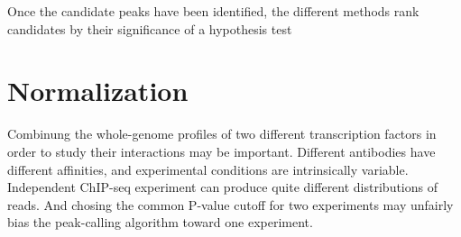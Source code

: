 

Once the candidate peaks have been identified, the different methods rank candidates by their significance of a hypothesis test

\section{Normalization}
Combinung the whole-genome profiles of two different transcription factors in order to study their interactions may be important.
Different antibodies have different affinities, and experimental conditions are intrinsically variable.
Independent ChIP-seq experiment can produce quite different distributions of reads.
And chosing the common P-value cutoff for two experiments may unfairly bias the peak-calling algorithm toward one experiment.
